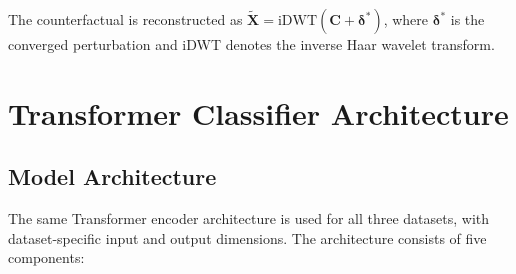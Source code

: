 The counterfactual is reconstructed as $\widetilde{\mathbf{X}} = \text{iDWT}(\mathbf{C} + \boldsymbol{\delta}^*)$, where $\boldsymbol{\delta}^*$ is the converged perturbation and iDWT denotes the inverse Haar wavelet transform.

\section{Transformer Classifier Architecture}

\subsection{Model Architecture}

The same Transformer encoder architecture is used for all three datasets, with dataset-specific input and output dimensions. The architecture consists of five components:

